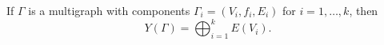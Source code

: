 If $\Gamma$ is a multigraph with components $\Gamma_i = (V_i, f_i, E_i)$ for $i = 1, \ldots, k$, then
$$Y(\Gamma) = \bigoplus_{i=1}^{k} E(V_i).$$
